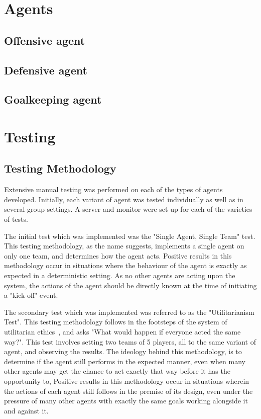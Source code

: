 \documentclass[conference]{IEEEtran}
\begin{document}
\section{Agents}
\subsection{Offensive agent}
\subsection{Defensive agent}
\subsection{Goalkeeping agent}

\section{Testing}
\subsection{Testing Methodology}
Extensive manual testing was performed on each of the types of agents developed.
Initially, each variant of agent was tested individually as well as in several group settings.
A server and monitor were set up for each of the varieties of tests.

The initial test which was implemented was the "Single Agent, Single Team" test.
This testing methodology, as the name suggests, implements a single agent on only one team, and determines how the agent acts.
Positive results in this methodology occur in situations where the behaviour of the agent is exactly as expected in a deterministic setting.
As no other agents are acting upon the system, the actions of the agent should be directly known at the time of initiating a "kick-off" event.

The secondary test which was implemented was referred to as the "Utilitarianism Test".
This testing methodology follows in the footsteps of the system of utilitarian ethics~\cite{b1}, and asks "What would happen if everyone acted the same way?".
This test involves setting two teams of 5 players, all to the same variant of agent, and observing the results.
The ideology behind this methodology, is to determine if the agent still performs in the expected manner, even when many other agents may get the chance to act exactly that way before it has the opportunity to,
Positive results in this methodology occur in situations wherein the actions of each agent still follows in the premise of its design, even under the pressure of many other agents with exactly the same goals working alongside it and against it.
\end{document}
